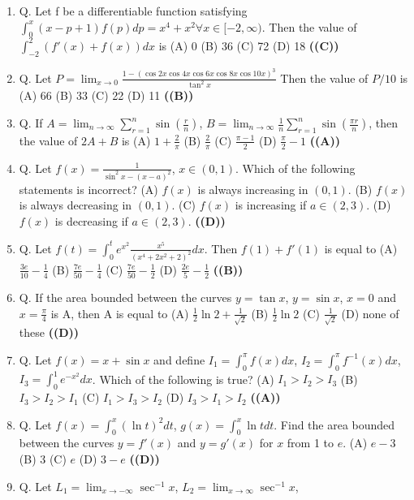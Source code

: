 \documentclass{article}
\begin{document}
\begin{enumerate}
Which of the following identities holds for all x, y \in R?
(A) f(x + y) = f(x) + f(y)
(B) f(x + y) = f(x) f(y)
(C) f(x + y) = f(x) + f(y) + f(x) f(y)
(D) f(x + y) = f(xy) \hfill \textbf{((C))}
\item Q. Let f be a differentiable function satisfying
$\int_0^x (x-p+1) f(p) dp = x^4 + x^2 \forall x \in [-2,\infty)$.
Then the value of
$\int_{-2}^2 (f'(x) + f(x)) dx$
is
(A) 0
(B) 36
(C) 72
(D) 18 \hfill \textbf{((C))}
\item Q. Let
$P = \lim_{x\to 0} \frac{1 - (\cos 2x \cos 4x \cos 6x \cos 8x \cos 10x)^3}{\tan^2 x}$
Then the value of $P/10$ is
(A) 66
(B) 33
(C) 22
(D) 11 \hfill \textbf{((B))}
\item Q. If
$A = \lim_{n\to\infty} \sum_{r=1}^n \sin(\frac{r}{n})$, $B = \lim_{n\to\infty} \frac{1}{n} \sum_{r=1}^n \sin(\frac{\pi r}{n})$,
then the value of $2A + B$ is
(A) $1+\frac{2}{\pi}$
(B) $\frac{2}{\pi}$
(C) $\frac{\pi-1}{2}$
(D) $\frac{\pi}{2}-1$ \hfill \textbf{((A))}
\item Q. Let
$f(x) = \frac{1}{\sin^2 x - (x-a)^2}$, $x \in (0,1)$.
Which of the following statements is incorrect?
(A) $f(x)$ is always increasing in $(0,1)$.
(B) $f(x)$ is always decreasing in $(0,1)$.
(C) $f(x)$ is increasing if $a \in (2,3)$.
(D) $f(x)$ is decreasing if $a \in (2,3)$. \hfill \textbf{((D))}
\item Q. Let
$f(t) = \int_0^t e^{x^2} \frac{x^5}{(x^4+2x^2+2)^2} dx$.
Then $f(1) + f'(1)$ is equal to
(A) $\frac{3e}{10} - \frac{1}{4}$
(B) $\frac{7e}{50} - \frac{1}{4}$
(C) $\frac{7e}{50} - \frac{1}{2}$
(D) $\frac{2e}{5} - \frac{1}{2}$ \hfill \textbf{((B))}
\item Q. If the area bounded between the curves $y = \tan x$, $y = \sin x$, $x = 0$ and $x = \frac{\pi}{4}$ is A, then A is equal to
(A) $\frac{1}{2} \ln 2 + \frac{1}{\sqrt{2}}$
(B) $\frac{1}{2} \ln 2$
(C) $\frac{1}{\sqrt{2}}$
(D) none of these \hfill \textbf{((D))}
\item Q. Let $f(x) = x + \sin x$ and define
$I_1 = \int_0^\pi f(x)dx$, $I_2 = \int_0^\pi f^{-1}(x)dx$, $I_3 = \int_0^1 e^{-x^2}dx$.
Which of the following is true?
(A) $I_1 > I_2 > I_3$
(B) $I_3 > I_2 > I_1$
(C) $I_1 > I_3 > I_2$
(D) $I_3 > I_1 > I_2$ \hfill \textbf{((A))}
\item Q. Let
$f(x) = \int_0^x (\ln t)^2 dt$, $g(x) = \int_0^x \ln t dt$.
Find the area bounded between the curves $y = f'(x)$ and $y = g'(x)$ for $x$ from 1 to $e$.
(A) $e-3$
(B) 3
(C) $e$
(D) $3-e$ \hfill \textbf{((D))}
\item Q. Let
$L_1 = \lim_{x\to -\infty} \sec^{-1} x$, $L_2 = \lim_{x\to \infty} \sec^{-1} x$,

\end{enumerate}
\end{document}
